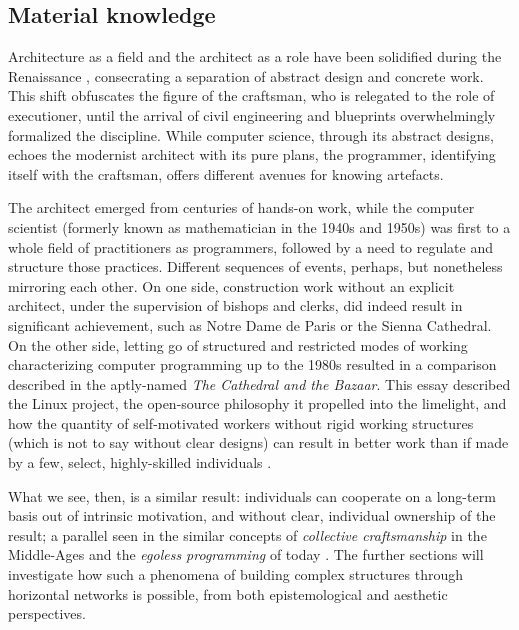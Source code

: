 \subsection{Material knowledge}
\label{subsec:material-knoweldge}

Architecture as a field and the architect as a role have been solidified during the Renaissance \citep{pevsner_term_1942}, consecrating a separation of abstract design and concrete work. This shift obfuscates the figure of the craftsman, who is relegated to the role of executioner, until the arrival of civil engineering and blueprints overwhelmingly formalized the discipline. While computer science, through its abstract designs, echoes the modernist architect with its pure plans, the programmer, identifying itself with the craftsman, offers different avenues for knowing artefacts.

The architect emerged from centuries of hands-on work, while the computer scientist (formerly known as mathematician in the 1940s and 1950s) was first to a whole field of practitioners as programmers, followed by a need to regulate and structure those practices. Different sequences of events, perhaps, but nonetheless mirroring each other. On one side, construction work without an explicit architect, under the supervision of bishops and clerks, did indeed result in significant achievement, such as Notre Dame de Paris or the Sienna Cathedral. On the other side, letting go of structured and restricted modes of working characterizing computer programming up to the 1980s resulted in a comparison described in the aptly-named \emph{The Cathedral and the Bazaar}. This essay described the Linux project, the open-source philosophy it propelled into the limelight, and how the quantity of self-motivated workers without rigid working structures (which is not to say without clear designs) can result in better work than if made by a few, select, highly-skilled individuals \citep{raymond_cathedral_2001,henningsen_joys_2020}.

What we see, then, is a similar result: individuals can cooperate on a long-term basis out of intrinsic motivation, and without clear, individual ownership of the result; a parallel seen in the similar concepts of \emph{collective craftsmanship} in the Middle-Ages and the \emph{egoless programming} of today \citep{brooksjr_mythical_1975}. The further sections will investigate how such a phenomena of building complex structures through horizontal networks is possible, from both epistemological and aesthetic perspectives.

